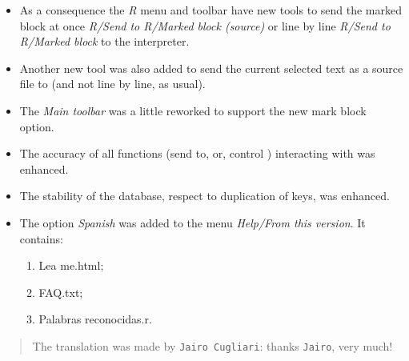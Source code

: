 \begin{itemize}
  \item As a consequence the \textit{R} menu and toolbar have new tools
    to send the marked block at once \textit{R/Send to R/Marked block (source)}
    or line by line \textit{R/Send to R/Marked block} to the \RR{}
    interpreter.
  \item Another new tool was also added to send the current selected text
    as a source file to \RR{} (and not line by line, as usual).
  \item The \textit{Main toolbar} was a little reworked to support the
    new mark block option.
  \item The accuracy of all functions (send to, or, control \RR{} )
    interacting with \RR{} was enhanced.
  \item The stability of the database, respect to duplication of
    keys, was enhanced.
  \item The option \textit{Spanish} was added to the menu
    \textit{Help/From this version}. It contains:
    \begin{enumerate}
      \item Lea me.html;
      \item FAQ.txt;
      \item Palabras reconocidas.r.
    \end{enumerate}
\end{itemize}

\begin{quotation}
  The translation was made by \texttt{Jairo Cugliari}: thanks \texttt{Jairo}, very much!
\end{quotation}

